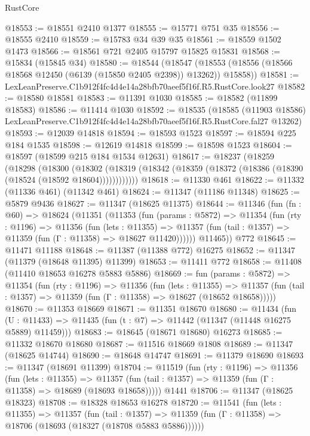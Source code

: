 \begin{lexlean}{RustCore}
\begin{coremodule}
@18553 := @18551 @2410 @1377
@18555 := @15771 @751 @35
@18556 := @18555 @2410
@18559 := @15783 @34 @39 @35
@18561 := @18559 @1502 @1473
@18566 := @18561 @721 @2405 @15797 @15825 @15831
@18568 := @15834 (@15845 @34)
@18580 := @18544
    (@18547 (@18553 (@18556 (@18566 @18568 @12450 (@6139 (@15850 @2405 @2398)) @13262)) @15858))
@18581 := LexLeanPreserve.C1b912f4fc4d4e14a28bfb70aeef5f16f.R5.RustCore.look27
@18582 := @18580 @18581
@18583 := @11391 @1030
@18585 := @18582 (@11899 @18583)
@18586 := @11414 @1030
@18592 := @18535
    (@18585
      (@11903 @18586)
      LexLeanPreserve.C1b912f4fc4d4e14a28bfb70aeef5f16f.R5.RustCore.fal27
      @13262)
@18593 := @12039 @14818
@18594 := @18593 @1523
@18597 := @18594 @225 @184 @1535
@18598 := @12619 @14818
@18599 := @18598 @1523
@18604 := @18597 (@18599 @215 @184 @1534 @12631)
@18617 := @18237
    (@18259
      (@18298
        (@18300
          (@18302 (@18319 (@18342 (@18359 (@18372 (@18386 (@18390 (@18524 (@18592 @18604))))))))))))
@18618 := @11330 @461
@18622 := @11332 (@11336 @461) (@11342 @461)
@18624 := @11347 (@11186 @11348)
@18625 := @5879 @9436
@18627 := @11347 (@18625 @11375)
@18644 := @11346
    (fun (fn : @60) =>
    @18624
      (@11351
        (@11353
          (fun (params : @5872) =>
          @11354
            (fun (rty : @1196) =>
            @11356
              (fun (lets : @11355) =>
              @11357 (fun (tail : @1357) => @11359 (fun (Γ : @11358) => @18627 @11420))))))
        @11465))
    @772
@18645 := @11471 @11188
@18648 := @11387 (@11388 @772) @16275
@18652 := @11347 (@11379 (@18648 @11395) @11399)
@18653 := @11411 @772
@18658 := @11408 (@11410 @18653 @16278 @5883 @5886)
@18669 := fun (params : @5872) =>
  @11354
    (fun (rty : @1196) =>
    @11356
      (fun (lets : @11355) =>
      @11357 (fun (tail : @1357) => @11359 (fun (Γ : @11358) => @18627 (@18652 @18658)))))
@18670 := @11353 @18669
@18671 := @11351 @18670
@18680 := @11434
    (fun (U : @11433) => @11435 (fun (t : @7) => @11442 (@11347 (@11448 @16275 @5889) @11459)))
@18683 := @18645 (@18671 @18680) @16273
@18685 := @11332 @18670 @18680
@18687 := @11516 @18669 @1808
@18689 := @11347 (@18625 @14744)
@18690 := @18648 @14747
@18691 := @11379 @18690
@18693 := @11347 (@18691 @11399)
@18704 := @11519
    (fun (rty : @1196) =>
    @11356
      (fun (lets : @11355) =>
      @11357 (fun (tail : @1357) => @11359 (fun (Γ : @11358) => @18689 (@18693 @18658)))))
    @1441
@18706 := @11347 (@18625 @18323)
@18708 := @18328 @18653 @16278
@18720 := @11541
    (fun (lets : @11355) =>
    @11357
      (fun (tail : @1357) =>
      @11359 (fun (Γ : @11358) => @18706 (@18693 (@18327 (@18708 @5883 @5886))))))

\end{coremodule}
\end{lexlean}

